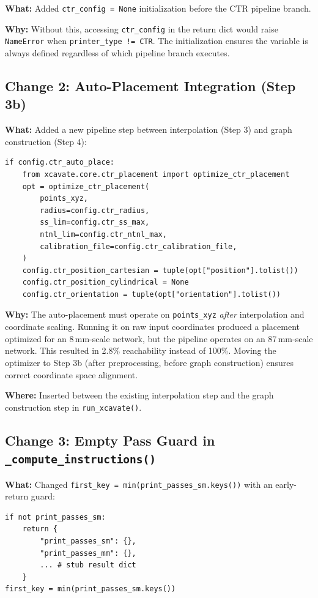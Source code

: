 \documentclass[11pt,a4paper]{article}
\newcommand{\funcname}[1]{\texttt{\textcolor{codepurple}{#1}}}
\begin{document}
\textbf{What:} Added \texttt{ctr\_config = None} initialization before the CTR pipeline branch.

\textbf{Why:} Without this, accessing \texttt{ctr\_config} in the return dict would raise \texttt{NameError} when \texttt{printer\_type != CTR}. The initialization ensures the variable is always defined regardless of which pipeline branch executes.

\subsection{Change 2: Auto-Placement Integration (Step 3b)}

\textbf{What:} Added a new pipeline step between interpolation (Step 3) and graph construction (Step 4):

\begin{lstlisting}
if config.ctr_auto_place:
    from xcavate.core.ctr_placement import optimize_ctr_placement
    opt = optimize_ctr_placement(
        points_xyz,
        radius=config.ctr_radius,
        ss_lim=config.ctr_ss_max,
        ntnl_lim=config.ctr_ntnl_max,
        calibration_file=config.ctr_calibration_file,
    )
    config.ctr_position_cartesian = tuple(opt["position"].tolist())
    config.ctr_position_cylindrical = None
    config.ctr_orientation = tuple(opt["orientation"].tolist())
\end{lstlisting}

\textbf{Why:} The auto-placement must operate on \texttt{points\_xyz} \emph{after} interpolation and coordinate scaling. Running it on raw input coordinates produced a placement optimized for an 8\,mm-scale network, but the pipeline operates on an 87\,mm-scale network. This resulted in 2.8\% reachability instead of 100\%. Moving the optimizer to Step 3b (after preprocessing, before graph construction) ensures correct coordinate space alignment.

\textbf{Where:} Inserted between the existing interpolation step and the graph construction step in \funcname{run\_xcavate()}.

\subsection{Change 3: Empty Pass Guard in \funcname{\_compute\_instructions()}}

\textbf{What:} Changed \texttt{first\_key = min(print\_passes\_sm.keys())} with an early-return guard:

\begin{lstlisting}
if not print_passes_sm:
    return {
        "print_passes_sm": {},
        "print_passes_mm": {},
        ... # stub result dict
    }
first_key = min(print_passes_sm.keys())
\end{lstlisting}
\end{document}

